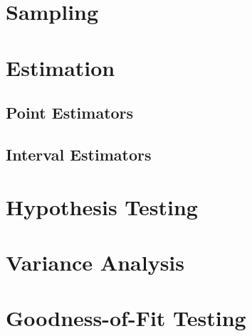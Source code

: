 \documentclass{article}
\begin{document}
\newpage
\section{Sampling}

\newpage
\section{Estimation}

\subsection{Point Estimators}
\subsection{Interval Estimators}

\newpage
\section{Hypothesis Testing}

\newpage
\section{Variance Analysis}

\newpage
\section{Goodness-of-Fit Testing}
\end{document}
